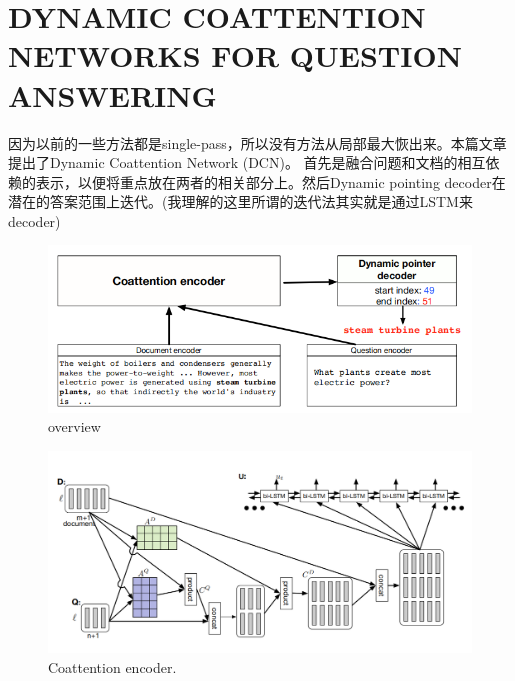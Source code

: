 \documentclass[a4paper,UTF8]{article}
\numberwithin{equation}{section}
\begin{document}
\section{DYNAMIC COATTENTION NETWORKS FOR QUESTION ANSWERING}
因为以前的一些方法都是single-pass，所以没有方法从局部最大恢出来。本篇文章提出了Dynamic Coattention Network (DCN)。
首先是融合问题和文档的相互依赖的表示，以便将重点放在两者的相关部分上。然后Dynamic pointing decoder在潜在的答案范围上迭代。(我理解的这里所谓的迭代法其实就是通过LSTM来decoder)
\begin{figure}[H]
	\centering
	\includegraphics[width=\textwidth]{2-1.png}
	\caption{overview}
\end{figure}
\begin{figure}[H]
	\centering
	\includegraphics[width=\textwidth]{2-2.png}
	\caption{Coattention encoder.}
\end{figure}
\end{document}

